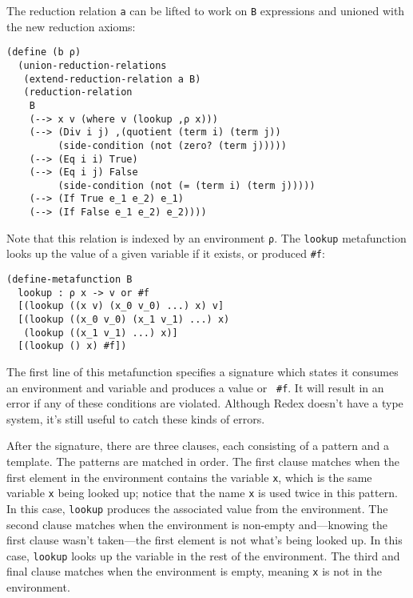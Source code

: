 The reduction relation {\tt a} can be lifted to work on {\tt B}
expressions and unioned with the new reduction axioms:
\begin{verbatim}
(define (b ρ)
  (union-reduction-relations
   (extend-reduction-relation a B)
   (reduction-relation
    B
    (--> x v (where v (lookup ,ρ x)))
    (--> (Div i j) ,(quotient (term i) (term j))
         (side-condition (not (zero? (term j)))))
    (--> (Eq i i) True)
    (--> (Eq i j) False
         (side-condition (not (= (term i) (term j)))))
    (--> (If True e_1 e_2) e_1)
    (--> (If False e_1 e_2) e_2))))
\end{verbatim}
Note that this relation is indexed by an environment {\tt ρ}.
The {\tt lookup} metafunction looks up the value of a given
variable if it exists, or produced {\tt \#f}:
\begin{verbatim}
(define-metafunction B
  lookup : ρ x -> v or #f
  [(lookup ((x v) (x_0 v_0) ...) x) v]
  [(lookup ((x_0 v_0) (x_1 v_1) ...) x)
   (lookup ((x_1 v_1) ...) x)]
  [(lookup () x) #f])
\end{verbatim}
The first line of this metafunction specifies a signature which states
it consumes an environment and variable and produces a value or {\tt
  \#f}.  It will result in an error if any of these conditions are
violated.  Although Redex doesn't have a type system, it's still
useful to catch these kinds of errors.

After the signature, there are three clauses, each consisting of a
pattern and a template.  The patterns are matched in order.  The first
clause matches when the first element in the environment contains the
variable {\tt x}, which is the same variable {\tt x} being looked up;
notice that the name {\tt x} is used twice in this pattern.  In this
case, {\tt lookup} produces the associated value from the environment.
The second clause matches when the environment is non-empty
and---knowing the first clause wasn't taken---the first element is not
what's being looked up.  In this case, {\tt lookup} looks up the
variable in the rest of the environment.  The third and final clause
matches when the environment is empty, meaning {\tt x} is not in the
environment.

